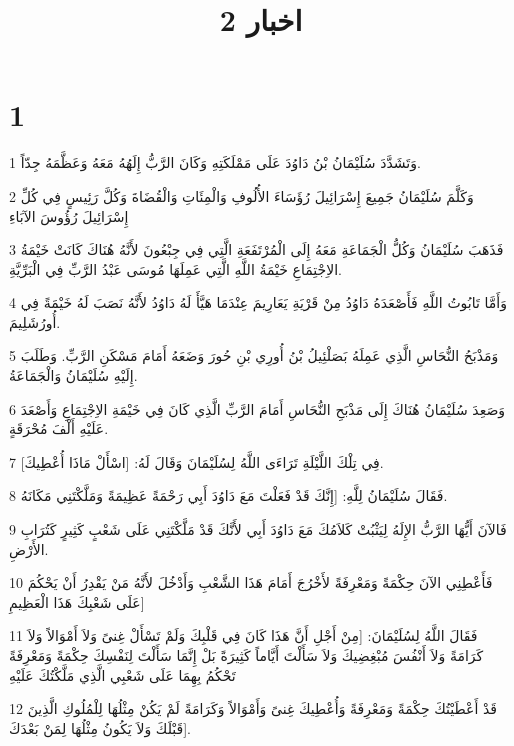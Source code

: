 

\title{2 اخبار}


\chapter{1}

\par 1 وَتَشَدَّدَ سُلَيْمَانُ بْنُ دَاوُدَ عَلَى مَمْلَكَتِهِ وَكَانَ الرَّبُّ إِلَهُهُ مَعَهُ وَعَظَّمَهُ جِدّاً.
\par 2 وَكَلَّمَ سُلَيْمَانُ جَمِيعَ إِسْرَائِيلَ رُؤَسَاءَ الأُلُوفِ وَالْمِئَاتِ وَالْقُضَاةَ وَكُلَّ رَئِيسٍ فِي كُلِّ إِسْرَائِيلَ رُؤُوسَ الآبَاءِ
\par 3 فَذَهَبَ سُلَيْمَانُ وَكُلُّ الْجَمَاعَةِ مَعَهُ إِلَى الْمُرْتَفَعَةِ الَّتِي فِي جِبْعُونَ لأَنَّهُ هُنَاكَ كَانَتْ خَيْمَةُ الاِجْتِمَاعِ خَيْمَةُ اللَّهِ الَّتِي عَمِلَهَا مُوسَى عَبْدُ الرَّبِّ فِي الْبَرِّيَّةِ.
\par 4 وَأَمَّا تَابُوتُ اللَّهِ فَأَصْعَدَهُ دَاوُدُ مِنْ قَرْيَةِ يَعَارِيمَ عِنْدَمَا هَيَّأَ لَهُ دَاوُدُ لأَنَّهُ نَصَبَ لَهُ خَيْمَةً فِي أُورُشَلِيمَ.
\par 5 وَمَذْبَحُ النُّحَاسِ الَّذِي عَمِلَهُ بَصَلْئِيلُ بْنُ أُورِي بْنِ حُورَ وَضَعَهُ أَمَامَ مَسْكَنِ الرَّبِّ. وَطَلَبَ إِلَيْهِ سُلَيْمَانُ وَالْجَمَاعَةُ.
\par 6 وَصَعِدَ سُلَيْمَانُ هُنَاكَ إِلَى مَذْبَحِ النُّحَاسِ أَمَامَ الرَّبِّ الَّذِي كَانَ فِي خَيْمَةِ الاِجْتِمَاعِ وَأَصْعَدَ عَلَيْهِ أَلْفَ مُحْرَقَةٍ.
\par 7 فِي تِلْكَ اللَّيْلَةِ تَرَاءَى اللَّهُ لِسُلَيْمَانَ وَقَالَ لَهُ: [اسْأَلْ مَاذَا أُعْطِيكَ].
\par 8 فَقَالَ سُلَيْمَانُ لِلَّهِ: [إِنَّكَ قَدْ فَعَلْتَ مَعَ دَاوُدَ أَبِي رَحْمَةً عَظِيمَةً وَمَلَّكْتَنِي مَكَانَهُ.
\par 9 فَالآنَ أَيُّهَا الرَّبُّ الإِلَهُ لِيَثْبُتْ كَلاَمُكَ مَعَ دَاوُدَ أَبِي لأَنَّكَ قَدْ مَلَّكْتَنِي عَلَى شَعْبٍ كَثِيرٍ كَتُرَابِ الأَرْضِ.
\par 10 فَأَعْطِنِي الآنَ حِكْمَةً وَمَعْرِفَةً لأَخْرُجَ أَمَامَ هَذَا الشَّعْبِ وَأَدْخُلَ لأَنَّهُ مَنْ يَقْدِرُ أَنْ يَحْكُمَ عَلَى شَعْبِكَ هَذَا الْعَظِيمِ]
\par 11 فَقَالَ اللَّهُ لِسُلَيْمَانَ: [مِنْ أَجْلِ أَنَّ هَذَا كَانَ فِي قَلْبِكَ وَلَمْ تَسْأَلْ غِنىً وَلاَ أَمْوَالاً وَلاَ كَرَامَةً وَلاَ أَنْفُسَ مُبْغِضِيكَ وَلاَ سَأَلْتَ أَيَّاماً كَثِيرَةً بَلْ إِنَّمَا سَأَلْتَ لِنَفْسِكَ حِكْمَةً وَمَعْرِفَةً تَحْكُمُ بِهِمَا عَلَى شَعْبِي الَّذِي مَلَّكْتُكَ عَلَيْهِ
\par 12 قَدْ أَعْطَيْتُكَ حِكْمَةً وَمَعْرِفَةً وَأُعْطِيكَ غِنىً وَأَمْوَالاً وَكَرَامَةً لَمْ يَكُنْ مِثْلُهَا لِلْمُلُوكِ الَّذِينَ قَبْلَكَ وَلاَ يَكُونُ مِثْلُهَا لِمَنْ بَعْدَكَ].

